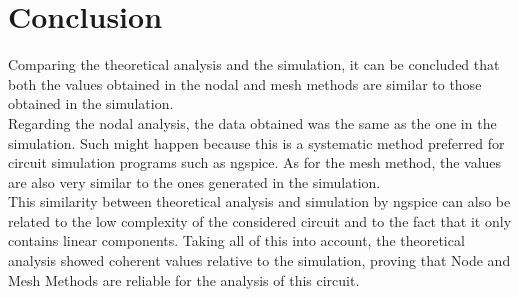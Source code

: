 \newpage
\section{Conclusion}
\label{sec:conclusion}
Comparing the theoretical analysis and the simulation, it can be concluded that both the values obtained in the nodal 
and mesh methods are similar to those obtained in the simulation. \\
\noindent Regarding the nodal analysis, the data obtained was the same as the one in the simulation. 
Such might happen because this is a systematic method preferred for circuit simulation programs such as ngspice.
As for the mesh method, the values are also very similar to the ones generated in the simulation. \\
This similarity between theoretical analysis and simulation by ngspice can also be related to the low complexity of the considered circuit
and to the fact that it only contains linear components.
\noindent Taking all of this into account, the theoretical analysis showed coherent values relative to the simulation, 
proving that Node and Mesh Methods are reliable for the analysis of this circuit.


